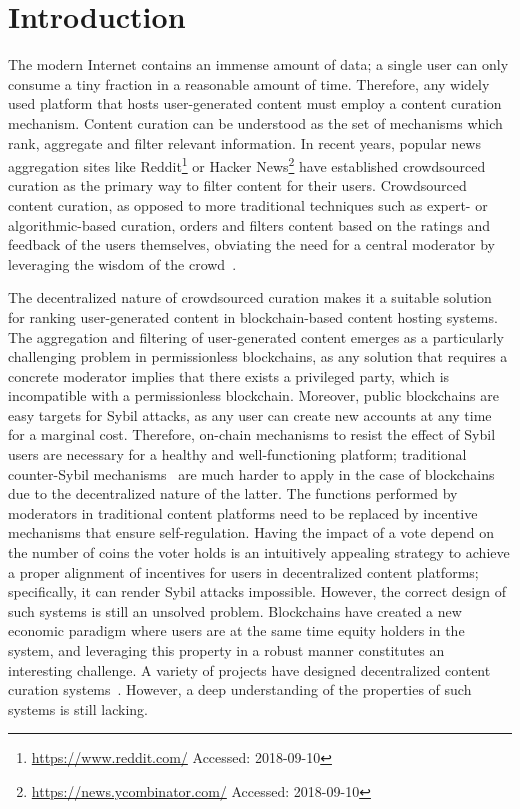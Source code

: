 \section{Introduction}
  The modern Internet contains an immense amount of data; a single user can only consume a tiny fraction in a reasonable amount of time. Therefore, any widely used platform that hosts user-generated content must employ a content curation mechanism.
   Content curation can be understood as the set of mechanisms which rank, aggregate and filter relevant information. In recent years, popular news aggregation sites like Reddit\footnote{\url{https://www.reddit.com/} Accessed: 2018-09-10} or Hacker News\footnote{\url{https://news.ycombinator.com/} Accessed: 2018-09-10} have established crowdsourced curation as the primary way to filter content for their users.
   Crowdsourced content curation, as opposed to more traditional techniques such as expert- or algorithmic-based curation, orders and filters content based on the ratings and feedback of the users themselves, obviating the need for a central moderator by leveraging the wisdom of the crowd~\cite{askalidis2013theoretical}.

  The decentralized nature of crowdsourced curation makes it a suitable solution for ranking user-generated content in blockchain-based content hosting systems. The aggregation and filtering of user-generated content emerges as a particularly challenging problem in permissionless blockchains, as any solution that requires a concrete moderator implies that there exists a privileged party, which is incompatible with a permissionless blockchain.
   Moreover, public blockchains are easy targets for Sybil attacks, as any user can create new accounts at any time for a marginal cost.
    Therefore, on-chain mechanisms to resist the effect of Sybil users are necessary for a healthy and well-functioning platform; traditional counter-Sybil mechanisms~\cite{levine2006survey} are much harder to apply in the case of blockchains due to the decentralized nature of the latter.
   The functions performed by moderators in traditional content platforms need to be replaced by incentive mechanisms that ensure self-regulation. Having the impact of a vote depend on the number of coins the voter holds is an intuitively appealing strategy to achieve a proper alignment of incentives for users in decentralized content platforms; specifically, it can render Sybil attacks impossible.
   However, the correct design of such systems is still an unsolved problem. Blockchains have created a new economic paradigm where users are at the same time equity holders in the system, and leveraging this property in a robust manner constitutes an interesting challenge.
   A variety of projects have designed decentralized content curation systems~\cite{synereo,steemit,tcr}. However, a deep understanding of the properties of such systems is still lacking.


